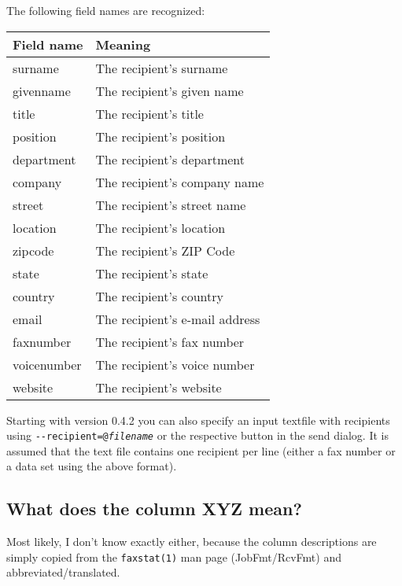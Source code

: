 \documentclass[a4paper,10pt]{scrartcl}
\begin{document}
The following field names are recognized:
\begin{center}
\begin{tabular}{|l|p{}|}
\hline
\bfseries Field name & \bfseries Meaning \\
\hline\hline
\ttfamily surname & The recipient's surname\\\hline
\ttfamily givenname & The recipient's given name \\\hline
\ttfamily title & The recipient's title \\\hline
\ttfamily position & The recipient's position \\\hline
\ttfamily department & The recipient's department\\\hline
\ttfamily company & The recipient's company name\\\hline
\ttfamily street & The recipient's street name \\\hline
\ttfamily location & The recipient's location\\\hline
\ttfamily zipcode & The recipient's ZIP Code \\\hline
\ttfamily state & The recipient's state\\\hline
\ttfamily country & The recipient's country\\\hline
\ttfamily email & The recipient's e-mail address\\\hline
\ttfamily faxnumber & The recipient's fax number \\\hline
\ttfamily voicenumber & The recipient's voice number \\\hline
\ttfamily website & The recipient's website\\\hline
\end{tabular}
\end{center}

Starting with version 0.4.2 you can also specify an input textfile with recipients using \texttt{-{-}recipient=@\textit{filename}} or the respective button in the send dialog.
It is assumed that the text file contains one recipient per line (either a fax number or a data set using the above format).

\subsection{What does the column XYZ mean?}

Most likely, I don't know exactly either, because the column descriptions
are simply copied from the \verb.faxstat(1). man page (JobFmt/RcvFmt) and 
abbreviated/translated.
\end{document}
